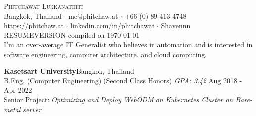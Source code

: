 \vspace*{-40pt}
\vspace*{-10pt}
\begin{center}
	{\Huge \scshape {Phitchawat Lukkanathiti}}\\
	\faMapMarker \vspace{0.4mm} Bangkok, Thailand $\cdot$ \faEnvelope \vspace{0.4mm} me@phitchaw.at $\cdot$ \faPhone \vspace{0.4mm} +66 (0) 89 413 4748 \\
  \faGlobe \vspace{0.4mm} https://phitchaw.at $\cdot$ \faLinkedinSquare \vspace{0.4mm} linkedin.com/in/phitchawat $\cdot$ \faGithub \vspace{0.4mm} Shayennn\\
\vspace{-2mm}
{\tiny{RESUMEVERSION compiled on \today}}\\
\vspace{2mm}
        I'm an over-average IT Generalist who believes in automation and is interested in software engineering, computer architecture, and cloud computing.
\end{center}
\vspace{2mm}

\textbf{Kasetsart University}\hfill Bangkok, Thailand\\
B.Eng. (Computer Engineering) (Second Class Honors) \textit{GPA: 3.42} \hfill Aug 2018 - Apr 2022\\
Senior Project: \textit{Optimizing and Deploy WebODM on Kubernetes Cluster on Bare-metal server}\\
\vspace{2mm}

\vspace{1mm}

